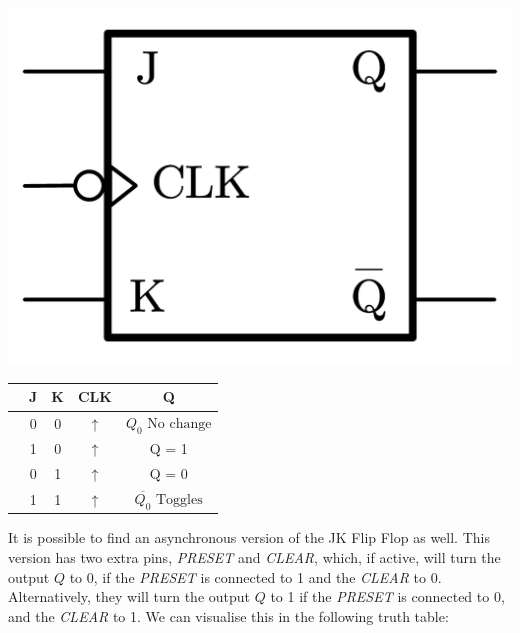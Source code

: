 \begin{minipage}{\textwidth}
    \begin{minipage}[b]{0.49\textwidth}
        \centering
        \includegraphics[scale=0.25]{Graphics/Practice 2/GRAPHICS/LOGIC GATES/JK SYNCH.pdf}
        \label{fig:JK_Synch}
    \end{minipage}
    \hfill
    \begin{minipage}[b]{0.49\textwidth}
        \centering
            \begin{tabular}[t]{lcccc}
                \toprule
                &\textbf{J}&\textbf{K}&\textbf{CLK}&\textbf{Q}\\
                \midrule
                &0&0& $\uparrow$ & $Q_0 \text{ No change}$\\
                &1&0& $\uparrow$ & Q = 1\\
                &0&1& $\uparrow$ & Q = 0\\
                &1&1& $\uparrow$ & $\overline{Q_0} \text{ Toggles}$\\
                \bottomrule
            \end{tabular}
        \label{table:JK_Synch_TT}
    \end{minipage}
\end{minipage}

\vspace{0.5cm}

It is possible to find an asynchronous version of the JK Flip Flop as well. This version has two extra pins, \textit{PRESET} and \textit{CLEAR}, which, if active, will turn the output $Q$ to 0, if the \textit{PRESET} is connected to 1 and the \textit{CLEAR} to 0. Alternatively, they will turn the output $Q$ to 1 if the \textit{PRESET} is connected to 0, and the \textit{CLEAR} to 1. We can visualise this in the following truth table: 

